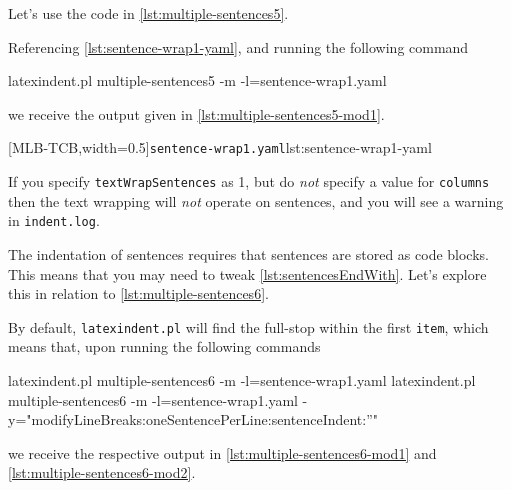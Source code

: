 	Let's use the code in \cref{lst:multiple-sentences5}.


	Referencing \cref{lst:sentence-wrap1-yaml}, and running the following command
	 
	\begin{commandshell}
latexindent.pl multiple-sentences5 -m -l=sentence-wrap1.yaml
\end{commandshell}
	we receive the output given in \cref{lst:multiple-sentences5-mod1}.

	\begin{cmhtcbraster}[ raster left skip=-3.5cm,
			raster right skip=-2cm,
			raster force size=false,
			raster column 1/.style={add to width=.1\textwidth},
			raster column skip=.06\linewidth]
		[MLB-TCB,width=0.5\textwidth]{\texttt{sentence-wrap1.yaml}}{lst:sentence-wrap1-yaml}
	\end{cmhtcbraster}

	If you specify \texttt{textWrapSentences} as 1, but do \emph{not} specify a value for
	\texttt{columns} then the text wrapping will \emph{not} operate on sentences, and you
	will see a warning in \texttt{indent.log}.

	The indentation of sentences requires that sentences are stored as code blocks. This
	means that you may need to tweak \vref{lst:sentencesEndWith}. Let's explore this in
	relation to \cref{lst:multiple-sentences6}.


	By default, \texttt{latexindent.pl} will find the full-stop within the first
	\texttt{item}, which means that, upon running the following commands   
	\begin{commandshell}
latexindent.pl multiple-sentences6 -m -l=sentence-wrap1.yaml 
latexindent.pl multiple-sentences6 -m -l=sentence-wrap1.yaml -y="modifyLineBreaks:oneSentencePerLine:sentenceIndent:''"
\end{commandshell}
	we receive the respective output in \cref{lst:multiple-sentences6-mod1} and
	\cref{lst:multiple-sentences6-mod2}.

